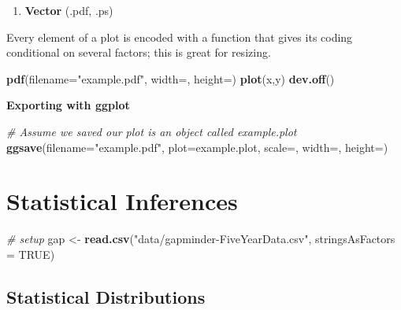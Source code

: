 \documentclass[]{book}
\newenvironment{Shaded}{\begin{snugshade}}{\end{snugshade}}
\newcommand{\CommentTok}[1]{\textcolor[rgb]{0.56,0.35,0.01}{\textit{#1}}}
\newcommand{\DataTypeTok}[1]{\textcolor[rgb]{0.13,0.29,0.53}{#1}}
\newcommand{\KeywordTok}[1]{\textcolor[rgb]{0.13,0.29,0.53}{\textbf{#1}}}
\newcommand{\NormalTok}[1]{#1}
\newcommand{\OtherTok}[1]{\textcolor[rgb]{0.56,0.35,0.01}{#1}}
\newcommand{\StringTok}[1]{\textcolor[rgb]{0.31,0.60,0.02}{#1}}
\providecommand{\tightlist}{%
  \setlength{\itemsep}{0pt}\setlength{\parskip}{0pt}}
\begin{document}
\begin{enumerate}
\def\labelenumi{\arabic{enumi})}
\setcounter{enumi}{1}
\tightlist
\item
  \textbf{Vector} (.pdf, .ps)
\end{enumerate}

Every element of a plot is encoded with a function that gives its coding conditional on several factors; this is great for resizing.

\begin{Shaded}
\begin{Highlighting}[]
\KeywordTok{pdf}\NormalTok{(}\DataTypeTok{filename=}\StringTok{"example.pdf"}\NormalTok{, }\DataTypeTok{width=}\NormalTok{, }\DataTypeTok{height=}\NormalTok{)}
\KeywordTok{plot}\NormalTok{(x,y)}
\KeywordTok{dev.off}\NormalTok{()}
\end{Highlighting}
\end{Shaded}

\textbf{Exporting with ggplot}

\begin{Shaded}
\begin{Highlighting}[]
\CommentTok{# Assume we saved our plot is an object called example.plot}
\KeywordTok{ggsave}\NormalTok{(}\DataTypeTok{filename=}\StringTok{"example.pdf"}\NormalTok{, }\DataTypeTok{plot=}\NormalTok{example.plot, }\DataTypeTok{scale=}\NormalTok{, }\DataTypeTok{width=}\NormalTok{, }\DataTypeTok{height=}\NormalTok{)}
\end{Highlighting}
\end{Shaded}

\hypertarget{statistical-inferences}{%
\chapter{Statistical Inferences}\label{statistical-inferences}}

\begin{Shaded}
\begin{Highlighting}[]
\CommentTok{# setup}
\NormalTok{gap <-}\StringTok{ }\KeywordTok{read.csv}\NormalTok{(}\StringTok{"data/gapminder-FiveYearData.csv"}\NormalTok{, }\DataTypeTok{stringsAsFactors =} \OtherTok{TRUE}\NormalTok{)}
\end{Highlighting}
\end{Shaded}

\hypertarget{statistical-distributions}{%
\section{Statistical Distributions}\label{statistical-distributions}}
\end{document}
